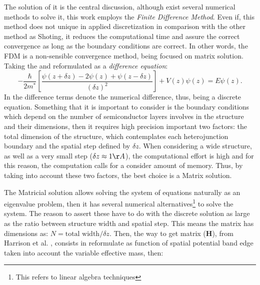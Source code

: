 The solution of  it is the central discussion, although exist several numerical methods to solve it, this work employs the \emph{Finite Difference Method}.
Even if, this method does not unique in applied discretization in comparison with the other method as Shoting\cite{killingbeck2020microcomputer,harrison2016quantum}, it reduces the computational time and assure the correct convergence as long as the boundary conditions are correct. In other words, the \gls{FDM} is a non-sensible convergence method, being focused on matrix solution.  Taking the  and reformulated as a \emph{difference equation}\cite{harrison2016quantum}:
\begin{equation}\label{eqn:chapter-2-sec-numerical-calculations-schrodinger-discrete}
	-\dfrac{\hbar}{2m^{*}}\left[\dfrac{\psi(z+\delta z)-2\psi(z)+\psi(z-\delta z)}{(\delta z)^2}\right] + V(z)\psi(z)=E\psi(z).
\end{equation}
In  the difference terms denote the numerical difference, thus,  being a discrete equation. Something that it is important to consider is the boundary conditions which depend on the number of semiconductor layers involves in the structure and their dimensions, then it requires high precision important two factors: the total dimension of the structure, which contemplates each heterojunction boundary and the spatial step defined by $\delta z$. When considering a wide structure, as well as a very small step ($\delta z \approx 1\AA$), the computational effort is high and for this reason, the computation calls for a consider amount of memory. Thus, by taking into account these two factors, the best choice is a Matrix solution.

The Matricial solution allows solving the system of equations naturally as an eigenvalue problem, then it has several numerical alternatives\footnote{This refers to linear algebra techniques\cite{harrison2016quantum,davidson1993monster}} to solve the system. The reason to assert these have to do with the discrete solution as large as the ratio between structure width and spatial step. This means the matrix has  dimensions as: $N = \text{total width}/\delta z$. Then, the way to get matrix ($\textbf{H}$), from Harrison et al. \cite{harrison2016quantum}, consists in reformulate   as function of spatial potential band edge taken into account the variable effective mass, then:

